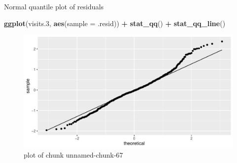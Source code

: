 \documentclass[ignorenonframetext,]{beamer}
\newenvironment{Shaded}{\begin{snugshade}}{\end{snugshade}}
\newcommand{\DataTypeTok}[1]{\textcolor[rgb]{0.13,0.29,0.53}{#1}}
\newcommand{\FloatTok}[1]{\textcolor[rgb]{0.00,0.00,0.81}{#1}}
\newcommand{\KeywordTok}[1]{\textcolor[rgb]{0.13,0.29,0.53}{\textbf{#1}}}
\newcommand{\NormalTok}[1]{#1}
\newcommand{\OperatorTok}[1]{\textcolor[rgb]{0.81,0.36,0.00}{\textbf{#1}}}
\newcommand{\StringTok}[1]{\textcolor[rgb]{0.31,0.60,0.02}{#1}}
\begin{document}
\begin{frame}[fragile]{Normal quantile plot of residuals}
\protect\hypertarget{normal-quantile-plot-of-residuals-1}{}

\begin{Shaded}
\begin{Highlighting}[]
\KeywordTok{ggplot}\NormalTok{(visits}\FloatTok{.3}\NormalTok{, }\KeywordTok{aes}\NormalTok{(}\DataTypeTok{sample =}\NormalTok{ .resid)) }\OperatorTok{+}\StringTok{ }\KeywordTok{stat_qq}\NormalTok{() }\OperatorTok{+}\StringTok{ }\KeywordTok{stat_qq_line}\NormalTok{()}
\end{Highlighting}
\end{Shaded}

\begin{figure}
\centering
\includegraphics{figure/unnamed-chunk-67-1.pdf}
\caption{plot of chunk unnamed-chunk-67}
\end{figure}

\end{frame}
\end{document}
